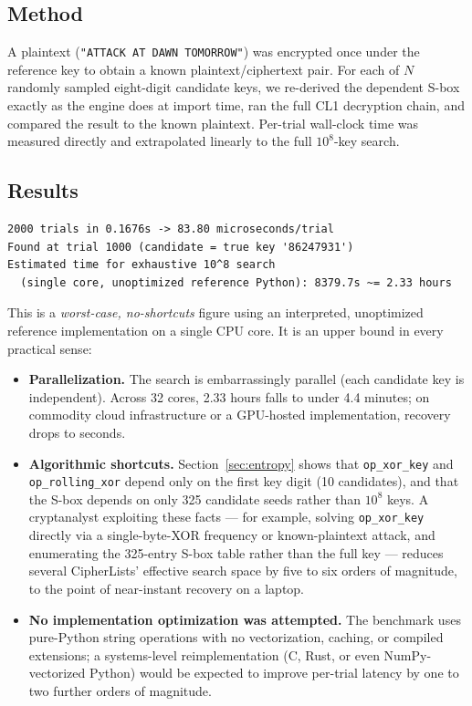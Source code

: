 \documentclass[11pt]{article}
\begin{document}
\subsection{Method}

A plaintext (\texttt{"ATTACK AT DAWN TOMORROW"}) was encrypted once
under the reference key to obtain a known plaintext/ciphertext pair.
For each of $N$ randomly sampled eight-digit candidate keys, we
re-derived the dependent S-box exactly as the engine does at import
time, ran the full CL1 decryption chain, and compared the result to the
known plaintext. Per-trial wall-clock time was measured directly and
extrapolated linearly to the full $10^{8}$-key search.

\subsection{Results}

\begin{lstlisting}
2000 trials in 0.1676s -> 83.80 microseconds/trial
Found at trial 1000 (candidate = true key '86247931')
Estimated time for exhaustive 10^8 search
  (single core, unoptimized reference Python): 8379.7s ~= 2.33 hours
\end{lstlisting}

This is a \emph{worst-case, no-shortcuts} figure using an interpreted,
unoptimized reference implementation on a single CPU core. It is an
upper bound in every practical sense:

\begin{itemize}[leftmargin=1.6em]
\item \textbf{Parallelization.} The search is embarrassingly parallel
(each candidate key is independent). Across 32 cores, 2.33 hours falls
to under 4.4 minutes; on commodity cloud infrastructure or a GPU-hosted
implementation, recovery drops to seconds.
\item \textbf{Algorithmic shortcuts.} Section~\ref{sec:entropy} shows
that \texttt{op\_xor\_key} and \texttt{op\_rolling\_xor} depend only on
the first key digit (10 candidates), and that the S-box depends on only
325 candidate seeds rather than $10^{8}$ keys. A cryptanalyst exploiting
these facts — for example, solving \texttt{op\_xor\_key} directly via a
single-byte-XOR frequency or known-plaintext attack, and enumerating the
325-entry S-box table rather than the full key — reduces several
CipherLists' effective search space by five to six orders of magnitude,
to the point of near-instant recovery on a laptop.
\item \textbf{No implementation optimization was attempted.} The
benchmark uses pure-Python string operations with no vectorization,
caching, or compiled extensions; a systems-level reimplementation (C,
Rust, or even NumPy-vectorized Python) would be expected to improve
per-trial latency by one to two further orders of magnitude.
\end{itemize}
\end{document}
